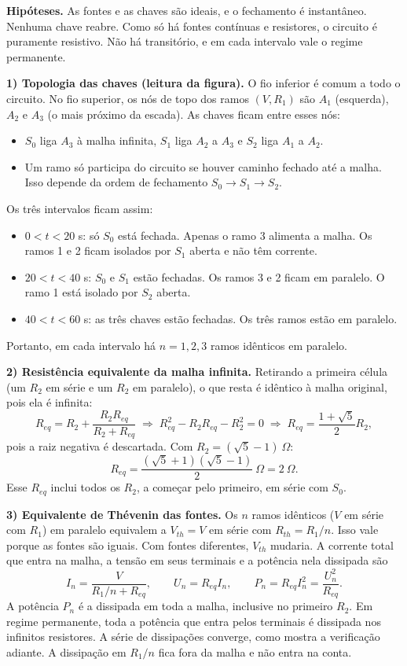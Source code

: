 \documentclass{article}%
\begin{document}
\textbf{Hipóteses.} As fontes e as chaves são ideais, e o fechamento é instantâneo. Nenhuma chave reabre. Como só há fontes contínuas e resistores, o circuito é puramente resistivo. Não há transitório, e em cada intervalo vale o regime permanente.

\textbf{1) Topologia das chaves (leitura da figura).} O fio inferior é comum a todo o circuito. No fio superior, os nós de topo dos ramos $(V,R_1)$ são $A_1$ (esquerda), $A_2$ e $A_3$ (o mais próximo da escada). As chaves ficam entre esses nós:
\begin{itemize}
\item $S_0$ liga $A_3$ à malha infinita, $S_1$ liga $A_2$ a $A_3$ e $S_2$ liga $A_1$ a $A_2$.
\item Um ramo só participa do circuito se houver caminho fechado até a malha. Isso depende da ordem de fechamento $S_0\to S_1\to S_2$.
\end{itemize}
Os três intervalos ficam assim:
\begin{itemize}
\item $0<t<20$ s: só $S_0$ está fechada. Apenas o ramo 3 alimenta a malha. Os ramos 1 e 2 ficam isolados por $S_1$ aberta e não têm corrente.
\item $20<t<40$ s: $S_0$ e $S_1$ estão fechadas. Os ramos 3 e 2 ficam em paralelo. O ramo 1 está isolado por $S_2$ aberta.
\item $40<t<60$ s: as três chaves estão fechadas. Os três ramos estão em paralelo.
\end{itemize}
Portanto, em cada intervalo há $n=1,2,3$ ramos idênticos em paralelo.

\textbf{2) Resistência equivalente da malha infinita.} Retirando a primeira célula (um $R_2$ em série e um $R_2$ em paralelo), o que resta é idêntico à malha original, pois ela é infinita:
\[
R_{eq}=R_2+\frac{R_2R_{eq}}{R_2+R_{eq}}
\;\Longrightarrow\; R_{eq}^2-R_2R_{eq}-R_2^2=0
\;\Longrightarrow\; R_{eq}=\frac{1+\sqrt5}{2}R_2 ,
\]
pois a raiz negativa é descartada. Com $R_2=(\sqrt5-1)\ \Omega$:
\[
R_{eq}=\frac{(\sqrt5+1)(\sqrt5-1)}{2}\ \Omega=2\ \Omega .
\]
Esse $R_{eq}$ inclui todos os $R_2$, a começar pelo primeiro, em série com $S_0$.

\textbf{3) Equivalente de Thévenin das fontes.} Os $n$ ramos idênticos ($V$ em série com $R_1$) em paralelo equivalem a $V_{th}=V$ em série com $R_{th}=R_1/n$. Isso vale porque as fontes são iguais. Com fontes diferentes, $V_{th}$ mudaria. A corrente total que entra na malha, a tensão em seus terminais e a potência nela dissipada são
\[
I_n=\frac{V}{R_1/n+R_{eq}},\qquad U_n=R_{eq}I_n,\qquad P_n=R_{eq}I_n^{2}=\frac{U_n^2}{R_{eq}} .
\]
A potência $P_n$ é a dissipada em toda a malha, inclusive no primeiro $R_2$. Em regime permanente, toda a potência que entra pelos terminais é dissipada nos infinitos resistores. A série de dissipações converge, como mostra a verificação adiante. A dissipação em $R_1/n$ fica fora da malha e não entra na conta.
\end{document}
